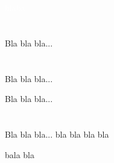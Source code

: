 \documentclass[12pt]{article}
\begin{document}
\thispagestyle{miestilo}
\textcolor{white}{blaba}
\vspace{1cm}

\newpage
\pagestyle{miestilo2}

\section{}
Bla bla bla...

\section{}


Bla bla bla...



Bla bla bla...

\section{}


Bla bla bla...
bla
bla
bla
bla
\vspace{30cm}

bala
bla
\end{document}
